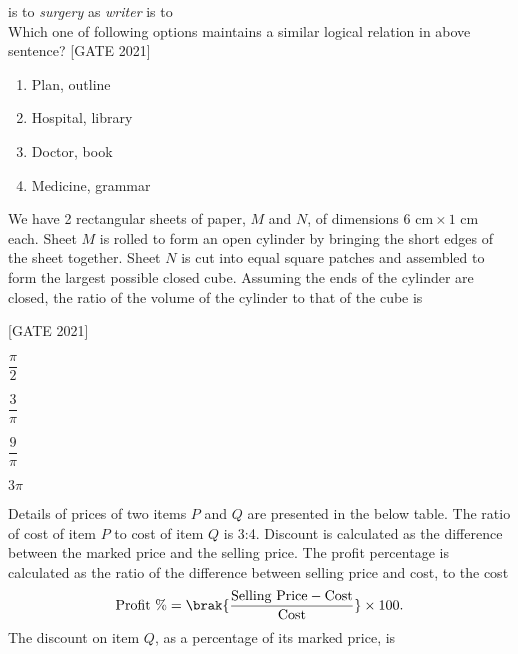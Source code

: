      \item \underline{\hspace{1.5cm}} is to \textit{surgery} as \textit{writer} is to \underline{\hspace{1.5cm}}\\
     Which one of following options maintains a similar logical relation in above sentence?
     \hfill{[GATE 2021]}\begin{multicols}{2}
     \begin{enumerate}
     \item Plan, outline
     \item Hospital, library
     \item Doctor, book
     \item Medicine, grammar
     \end{enumerate}
     \end{multicols}
\item We have 2 rectangular sheets of paper, $ M $ and $ N $, of dimensions $ 6  \text{ cm} \times 1  \text{ cm} $ each. Sheet $ M $ is rolled to form an open cylinder by bringing the short edges of the sheet together. Sheet $ N $ is cut into equal square patches and assembled to form the largest possible closed cube. Assuming the ends of the cylinder are closed, the ratio of the volume of the cylinder to that of the cube is

\hfill{[GATE 2021]}
\begin{enumerate}
\begin{multicols}{4}
    \item $ \dfrac{\pi}{2} $
    \item $ \dfrac{3}{\pi} $
    \item $ \dfrac{9}{\pi} $
    \item $ 3\pi $
\end{multicols}
\end{enumerate}
\item Details of prices of two items $ P $ and $ Q $ are presented in the below table. The ratio of cost of item $ P $ to cost of item $ Q $ is 3:4. Discount is calculated as the difference between the marked price and the selling price. The profit percentage is calculated as the ratio of the difference between selling price and cost, to the cost 
\begin{align*}
\text{Profit \%} = \brak{\dfrac{\text{Selling Price} - \text{Cost}}{\text{Cost}}} \times 100.
\end{align*}
The discount on item $ Q $, as a percentage of its marked price, is \\

